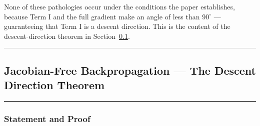 \documentclass{article}
\begin{document}
None of these pathologies occur under the conditions the paper establishes,
because Term I and the full gradient make an angle of less than $90^{\circ}$ ---
guaranteeing that Term I is a descent direction. This is the content of
the descent-direction theorem in Section~\ref{sec:jfb-descent}.

\medskip

\hrule

\subsection{Jacobian-Free Backpropagation --- The Descent Direction Theorem}
\label{sec:jfb-descent}

\medskip\hrule\medskip

\subsubsection{Statement and Proof}
\end{document}
